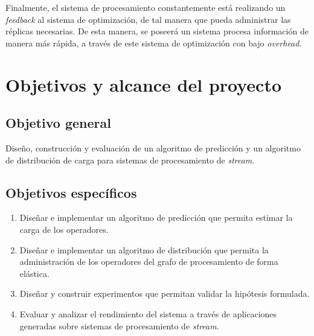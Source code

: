 Finalmente, el sistema de procesamiento constantemente está realizando un \textit{feedback} al sistema de optimización, de tal manera que pueda administrar las réplicas necesarias. De esta manera, se poseerá un sistema procesa información de manera más rápida, a través de este sistema de optimización con bajo \textit{overhead}.


\section{Objetivos y alcance del proyecto}
\label{intro:objetivos}

\subsection{Objetivo general}
	Dise\~no, construcción y evaluaci\'on de un algoritmo de predicci\'on y un algoritmo de distribuci\'on de carga para sistemas de procesamiento de \textit{stream}.

\subsection{Objetivos específicos}
\begin{enumerate}
	\item Dise\~nar e implementar un algoritmo de predicci\'on que permita estimar la carga de los operadores.
	\item Dise\~nar e implementar un algoritmo de distribuci\'on que permita la administraci\'on de los operadores del grafo de procesamiento de forma el\'astica.
	\item Dise\~nar y construir experimentos que permitan validar la hip\'otesis formulada.
	\item Evaluar y analizar el rendimiento del sistema a trav\'es de aplicaciones generadas sobre sistemas de procesamiento de \textit{stream}.
\end{enumerate}

